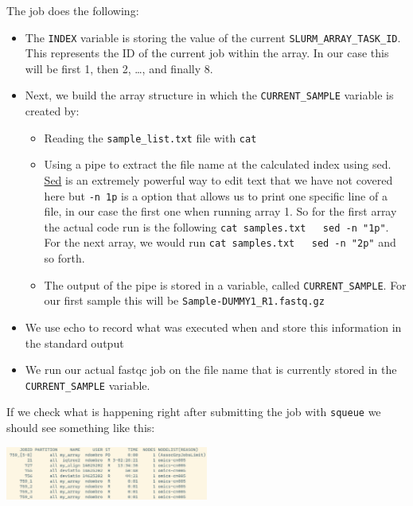 \documentclass[
  letterpaper,
  DIV=11,
  numbers=noendperiod]{scrreprt}
\providecommand{\tightlist}{%
  \setlength{\itemsep}{0pt}\setlength{\parskip}{0pt}}\usepackage{longtable,booktabs,array}
\begin{document}
\begin{tcolorbox}
The job does the following:

\begin{itemize}
\tightlist
\item
  The \texttt{INDEX} variable is storing the value of the current
  \texttt{SLURM\_ARRAY\_TASK\_ID}. This represents the ID of the current
  job within the array. In our case this will be first 1, then 2,
  \ldots, and finally 8.
\item
  Next, we build the array structure in which the
  \texttt{CURRENT\_SAMPLE} variable is created by:

  \begin{itemize}
  \tightlist
  \item
    Reading the \texttt{sample\_list.txt} file with \texttt{cat}
  \item
    Using a pipe to extract the file name at the calculated index using
    sed.
    \href{https://scienceparkstudygroup.github.io/software_information/source/cli/cli_file_manipulation.html\#sed-manipulating-the-content-of-files}{Sed}
    is an extremely powerful way to edit text that we have not covered
    here but \texttt{-n\ 1p} is a option that allows us to print one
    specific line of a file, in our case the first one when running
    array 1. So for the first array the actual code run is the following
    \texttt{cat\ samples.txt\ \textbar{}\ \ sed\ -n\ "1p"}. For the next
    array, we would run
    \texttt{cat\ samples.txt\ \textbar{}\ \ sed\ -n\ "2p"} and so forth.
  \item
    The output of the pipe is stored in a variable, called
    \texttt{CURRENT\_SAMPLE}. For our first sample this will be
    \texttt{Sample-DUMMY1\_R1.fastq.gz}
  \end{itemize}
\item
  We use echo to record what was executed when and store this
  information in the standard output
\item
  We run our actual fastqc job on the file name that is currently stored
  in the \texttt{CURRENT\_SAMPLE} variable.
\end{itemize}

If we check what is happening right after submitting the job with
\texttt{squeue} we should see something like this:

\begin{center}
\includegraphics[width=0.5\textwidth,height=\textheight]{../img/arrays.png}
\end{center}


\end{tcolorbox}
\end{document}
